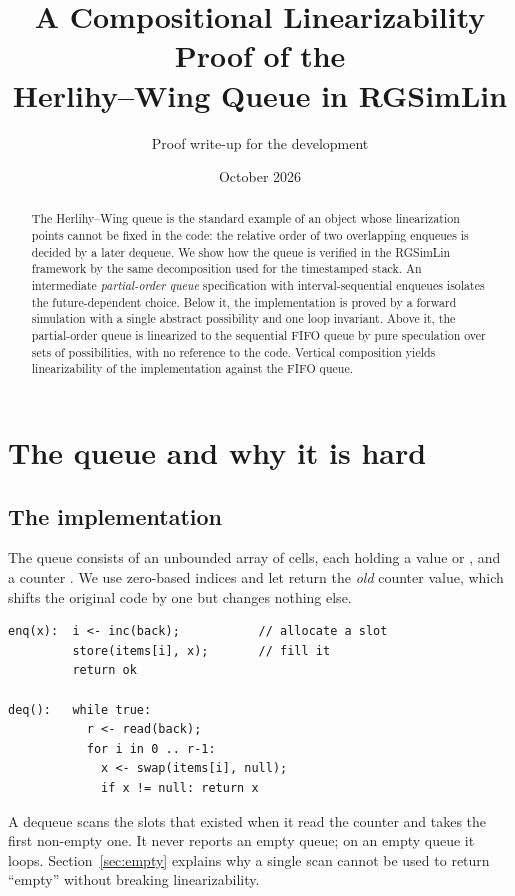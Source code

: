\documentclass[11pt]{article}
\title{A Compositional Linearizability Proof of the\\Herlihy--Wing Queue in RGSimLin}
\author{Proof write-up for the \code{rbgs-rglin} development}
\date{October 2026}
\theoremstyle{definition}
\theoremstyle{remark}
\newcommand{\code}[1]{\texttt{\detokenize{#1}}}
\begin{document}
\maketitle

\begin{abstract}
The Herlihy--Wing queue is the standard example of an object whose
linearization points cannot be fixed in the code: the relative order of two
overlapping enqueues is decided by a later dequeue.  We show how the queue is
verified in the RGSimLin framework by the same decomposition used for the
timestamped stack.  An intermediate \emph{partial-order queue} specification
with interval-sequential enqueues isolates the future-dependent choice.  Below
it, the implementation is proved by a forward simulation with a single
abstract possibility and one loop invariant.  Above it, the partial-order
queue is linearized to the sequential FIFO queue by pure speculation over sets
of possibilities, with no reference to the code.  Vertical composition yields
linearizability of the implementation against the FIFO queue.
\end{abstract}

\tableofcontents

\section{The queue and why it is hard}

\subsection{The implementation}

The queue consists of an unbounded array \code{items} of cells, each holding
a value or \code{null}, and a counter \code{back}.  We use zero-based indices
and let \code{inc} return the \emph{old} counter value, which shifts the
original code by one but changes nothing else.

\begin{lstlisting}
enq(x):  i <- inc(back);           // allocate a slot
         store(items[i], x);       // fill it
         return ok

deq():   while true:
           r <- read(back);
           for i in 0 .. r-1:
             x <- swap(items[i], null);
             if x != null: return x
\end{lstlisting}

A dequeue scans the slots that existed when it read the counter and takes
the first non-empty one.  It never reports an empty queue; on an empty queue
it loops.  Section~\ref{sec:empty} explains why a single scan cannot be used
to return ``empty'' without breaking linearizability.
\end{document}
